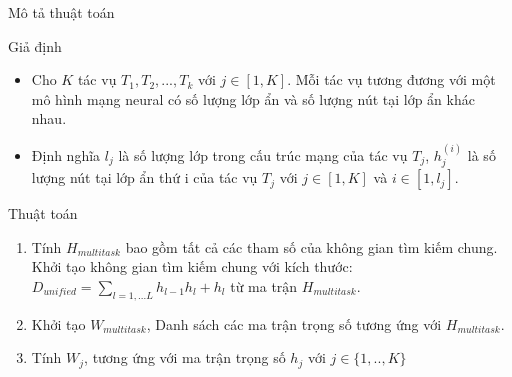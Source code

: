	\begin{frame}{Mô tả thuật toán}
	    \begin{itemize}
		    \begin{block}{Giả định}
		        \begin{itemize}
	                \setlength\itemsep{0.01em}
	                \item Cho $K$ tác vụ $T_1, T_2, ... ,T_k$ với $j \in [1,K]$. Mỗi tác vụ tương đương với một mô hình mạng neural có số lượng lớp ẩn và số lượng nút tại lớp ẩn khác nhau. 
                    \item Định nghĩa $l_j$ là số lượng lớp trong cấu trúc mạng của tác vụ $T_j$, $h_j^{(i)}$ là số lượng nút tại lớp ẩn thứ i của tác vụ $T_j$ với  $j \in [1,K]$ và  $i \in [1,l_j]$.
	            \end{itemize}
		    \end{block}
		    \begin{block}{Thuật toán}
		        \begin{enumerate}
		            \item Tính $H_{multitask}$ bao gồm tất cả các tham số của không gian tìm kiếm chung.
		            Khởi tạo không gian tìm kiếm chung với kích thước:\\
		            $D_{unified} = \sum_{l={1,...L}}h_{l-1}h_l + h_l$ từ ma trận $H_{multitask}$.
                    \item Khởi tạo $W_{multitask}$, Danh sách các ma trận trọng số tương ứng với $H_{multitask}$.
                    \item Tính $W_{j}$, tương ứng với ma trận trọng số $h_{j}$ với $j \in \{1, ..,K\}$
		        \end{enumerate}
		    \end{block}
		\end{itemize}
	\end{frame}
	
